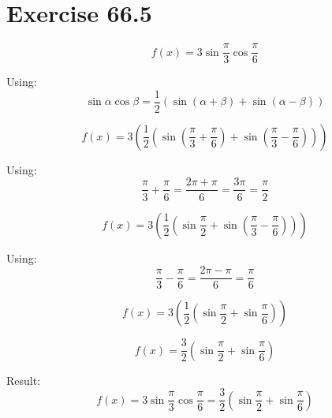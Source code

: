 \documentclass[a4paper, 10pt]{scrartcl}
\begin{document}
\section{Exercise 66.5}

\[f(x) = 3\sin{\frac{\pi}{3}}\cos{\frac{\pi}{6}}\]

Using:
\[\sin{\alpha}\cos{\beta} = \frac{1}{2}(\sin{(\alpha + \beta)} + \sin{(\alpha - \beta)})\]

\[f(x) = 3\left(\frac{1}{2}(\sin{(\frac{\pi}{3} + \frac{\pi}{6})} +
        \sin{(\frac{\pi}{3} - \frac{\pi}{6})})\right)\]

Using:
\[\frac{\pi}{3} + \frac{\pi}{6} = \frac{2\pi + \pi}{6} = \frac{3\pi}{6} = \frac{\pi}{2}\]

\[f(x) = 3\left(\frac{1}{2}(\sin{\frac{\pi}{2}} +
        \sin{(\frac{\pi}{3} - \frac{\pi}{6})})\right)\]

Using:
\[\frac{\pi}{3} - \frac{\pi}{6} = \frac{2\pi - \pi}{6} = \frac{\pi}{6}\]

\[f(x) = 3\left(\frac{1}{2}(\sin{\frac{\pi}{2}} +
        \sin{\frac{\pi}{6}})\right)\]

\[f(x) = \frac{3}{2}(\sin{\frac{\pi}{2}} + \sin{\frac{\pi}{6}})\]

Result:
\[f(x) = 3\sin{\frac{\pi}{3}}\cos{\frac{\pi}{6}}
       = \frac{3}{2}(\sin{\frac{\pi}{2}} + \sin{\frac{\pi}{6}})\]
\end{document}

